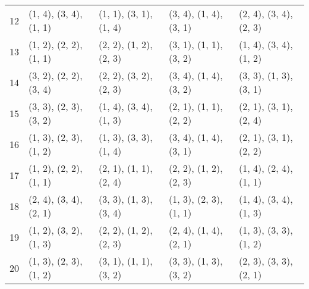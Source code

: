 \begin{table}[]
{\begin{tabular}{@{}lllll@{}}
			12 & (1, 4), (3, 4), (1, 1) & (1, 1), (3, 1), (1, 4) & (3, 4), (1, 4), (3, 1) & (2, 4), (3, 4), (2, 3) \\
			13 & (1, 2), (2, 2), (1, 1) & (2, 2), (1, 2), (2, 3) & (3, 1), (1, 1), (3, 2) & (1, 4), (3, 4), (1, 2) \\
			14 & (3, 2), (2, 2), (3, 4) & (2, 2), (3, 2), (2, 3) & (3, 4), (1, 4), (3, 2) & (3, 3), (1, 3), (3, 1) \\
			15 & (3, 3), (2, 3), (3, 2) & (1, 4), (3, 4), (1, 3) & (2, 1), (1, 1), (2, 2) & (2, 1), (3, 1), (2, 4) \\
			16 & (1, 3), (2, 3), (1, 2) & (1, 3), (3, 3), (1, 4) & (3, 4), (1, 4), (3, 1) & (2, 1), (3, 1), (2, 2) \\
			17 & (1, 2), (2, 2), (1, 1) & (2, 1), (1, 1), (2, 4) & (2, 2), (1, 2), (2, 3) & (1, 4), (2, 4), (1, 1) \\
			18 & (2, 4), (3, 4), (2, 1) & (3, 3), (1, 3), (3, 4) & (1, 3), (2, 3), (1, 1) & (1, 4), (3, 4), (1, 3) \\
			19 & (1, 2), (3, 2), (1, 3) & (2, 2), (1, 2), (2, 3) & (2, 4), (1, 4), (2, 1) & (1, 3), (3, 3), (1, 2) \\
			20 & (1, 3), (2, 3), (1, 2) & (3, 1), (1, 1), (3, 2) & (3, 3), (1, 3), (3, 2) & (2, 3), (3, 3), (2, 1) \\ \bottomrule
		\end{tabular}%
	}
\end{table}



\ifliteratur
    \printbibliography[heading=subbibintoc]
\fi

\ifglossar
    \printglossary[style=altlist,title=\langglossar]
\fi
